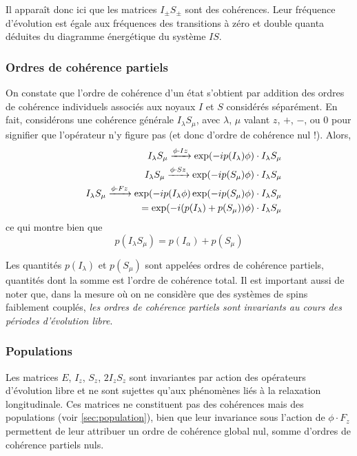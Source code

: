 Il apparaît donc ici que les matrices $I_{\pm}S_{\pm}$ sont des cohérences.
Leur fréquence d'évolution est égale aux fréquences des transitions
à zéro et double quanta déduites du diagramme énergétique du système $IS$.

\subsubsection{Ordres de cohérence partiels}
On constate que l'ordre de cohérence d'un état s'obtient par addition des ordres
de cohérence individuels associés aux noyaux $I$ et $S$ considérés séparément.
En fait, considérons une cohérence générale $I_{\lambda}S_{\mu}$, avec $\lambda$, $\mu$
valant $z$, $+$, $-$, ou 0 pour signifier que l'opérateur n'y figure pas
(et donc d'ordre de cohérence nul !).
Alors,
\begin{eqnarray}
& &I_{\lambda}S_{\mu} \xrightarrow{\phi \cdot Iz}
\exp(-i p(I_{\lambda}) \phi) \cdot I_{\lambda}S_{\mu}\\
& &I_{\lambda}S_{\mu} \xrightarrow{\phi \cdot Sz}
\exp(-i p(S_{\mu}) \phi) \cdot I_{\lambda}S_{\mu}\\
& &I_{\lambda}S_{\mu} \xrightarrow{\phi \cdot Fz}
\exp(-i p(I_{\lambda} \phi)\exp(-i p(S_{\mu}) \phi) \cdot I_{\lambda}S_{\mu}\nonumber\\
& & \quad = \exp(-i (p(I_{\lambda})+p(S_{\mu})) \phi) \cdot I_{\lambda}S_{\mu}
\end{eqnarray}
ce qui montre bien que
\begin{equation}
p(I_{\lambda}S_{\mu}) = p(I_{\alpha}) + p(S_{\mu})
\end{equation}

Les quantités $p(I_{\lambda})$ et $p(S_{\mu})$ sont appelées ordres de cohérence partiels,
quantités dont la somme est l'ordre de cohérence total.
Il est important aussi de noter que, dans la mesure où on ne considère
que des systèmes de spins faiblement couplés,
\emph{les ordres de cohérence partiels sont invariants au cours des périodes
d'évolution libre}. 

\subsubsection{Populations}
Les matrices $E$, $I_z$, $S_z$, $2I_zS_z$ sont invariantes par action des opérateurs 
d'évolution libre et ne sont sujettes qu'aux phénomènes liés à la relaxation longitudinale.
Ces matrices ne constituent pas des cohérences mais des populations (voir \ref{sec:population}),
bien que leur invariance sous l'action de $\phi \cdot F_z$ permettent de leur
attribuer un ordre de cohérence global nul, somme d'ordres de cohérence partiels nuls.

